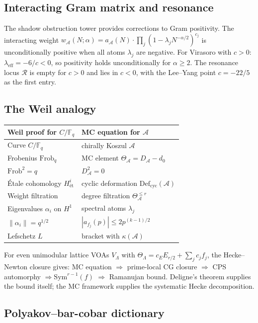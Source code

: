 \documentclass[11pt,reqno]{amsart}
\theoremstyle{definition}
\theoremstyle{remark}
\providecommand{\cA}{\mathcal{A}}
\providecommand{\cR}{\mathcal{R}}
\providecommand{\Defcyc}{\mathrm{Def}_{\mathrm{cyc}}}
\providecommand{\Sym}{\mathrm{Sym}}
\providecommand{\Defcyc}{\mathrm{Def}_{\mathrm{cyc}}}
\providecommand{\bF}{\mathbb{F}}
\numberwithin{equation}{section}
\begin{document}
\subsection*{Interacting Gram matrix and resonance}

The shadow obstruction tower provides corrections to Gram
positivity. The interacting weight
$w_\cA(N;\alpha) = a_\cA(N)\cdot\prod_j(1 - \lambda_j N^{-\alpha/2})^{c_j}$
is unconditionally positive when all atoms $\lambda_j$ are
negative. For Virasoro with $c > 0$:
$\lambda_{\mathrm{eff}} = -6/c < 0$, so positivity holds
unconditionally for $\alpha \ge 2$. The resonance locus $\cR$
is empty for $c > 0$ and lies in $c < 0$, with the Lee--Yang
point $c = -22/5$ as the first entry.

\subsection*{The Weil analogy}

\begin{center}
\small
\renewcommand{\arraystretch}{1.1}
\begin{tabular}{ll}
\textbf{Weil proof for $C/\bF_q$} & \textbf{MC equation for $\cA$}\\ \hline
Curve $C/\bF_q$ & chirally Koszul $\cA$\\
Frobenius $\mathrm{Frob}_q$ & MC element $\Theta_\cA = D_\cA - d_0$\\
$\mathrm{Frob}^2 = q$ & $D_\cA^2 = 0$\\
\'Etale cohomology $H^i_{\text{\'et}}$ & cyclic deformation $\Defcyc(\cA)$\\
Weight filtration & degree filtration $\Theta_\cA^{\le r}$\\
Eigenvalues $\alpha_i$ on $H^1$ & spectral atoms $\lambda_j$\\
$\|\alpha_i\| = q^{1/2}$ & $|a_{f_j}(p)| \le 2p^{(k-1)/2}$\\
Lefschetz $L$ & bracket with $\kappa(\cA)$
\end{tabular}
\end{center}
For even unimodular lattice VOAs $V_\Lambda$ with
$\Theta_\Lambda = c_E E_{r/2} + \sum_j c_j f_j$, the
Hecke--Newton closure gives: MC equation $\Rightarrow$
prime-local CG closure $\Rightarrow$ CPS automorphy
$\Rightarrow \Sym^{r-1}(f)$ $\Rightarrow$ Ramanujan bound.
Deligne's theorem supplies the bound itself; the MC framework
supplies the systematic Hecke decomposition.

\subsection*{Polyakov--bar-cobar dictionary}
\end{document}
